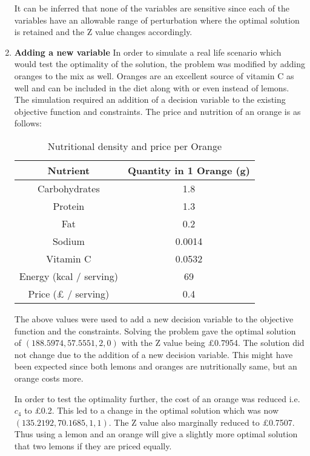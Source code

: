 \documentclass[
]{article}
\begin{document}
\begin{enumerate}
	      It can be inferred that none of the variables are sensitive since each of the variables have an allowable range of perturbation where the optimal solution is retained and the Z value changes accordingly.
	      	        
	\item \textbf{Adding a new variable}
	      In order to simulate a real life scenario which would test the optimality of the solution, the problem was modified by adding oranges to the mix as well.
	      Oranges are an excellent source of vitamin C as well and can be included in the diet along with or even instead of lemons. The simulation required an addition of a decision variable to the existing objective function and constraints.
	      The price and nutrition of an orange is as follows:
	      \begin{table}[h!]
	      	\centering
	      	\begin{tabular}{||c | c ||} 
	      		\hline
	      		Nutrient                & Quantity in 1 Orange (g) \\ [1ex] 
	      		\hline\hline
	      		Carbohydrates           & 1.8                      \\
	      		Protein                 & 1.3                      \\
	      		Fat                     & 0.2                      \\
	      		Sodium                  & 0.0014                   \\
	      		Vitamin C               & 0.0532                   \\ [1ex] 
	      		\hline
	      		Energy (kcal / serving) & 69                       \\ 
	      		\hline
	      		Price (£ / serving)    & 0.4                      \\ [1ex] 
	      		\hline
	      	\end{tabular}
	      	\caption{Nutritional density and price per Orange}
	      	\label{table}
	      \end{table}
	      	        
	      The above values were used to add a new decision variable to the objective function and the constraints.
	      Solving the problem gave the optimal solution of $\left(188.5974, 57.5551, 2, 0\right)$ with the Z value being \pounds 0.7954.
	      The solution did not change due to the addition of a new decision variable. This might have been expected since both lemons and oranges are nutritionally same, but an orange costs more.
	      	        
	      In order to test the optimality further, the cost of an orange was reduced i.e. $c_4$ to \pounds 0.2. This led to a change in the optimal solution which was now $\left(135.2192, 70.1685, 1, 1\right)$.
	      The Z value also marginally reduced to \pounds 0.7507. Thus using a lemon and an orange will give a slightly more optimal solution that two lemons if they are priced equally.
\end{enumerate}
\end{document}
